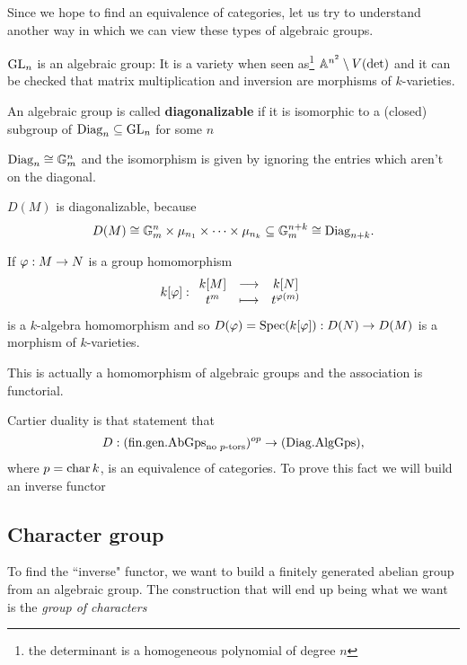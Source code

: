 Since we hope to find an equivalence of categories, let us try to understand another way in which we can view these types of algebraic groups.



\begin{remark}
$\mathrm{GL}_n$ is an algebraic group: It is a variety when seen as\footnote{the determinant is a homogeneous polynomial of degree $n$} $\mathbb{A}^{n^2}\setminus V(\det)$ and it can be checked that matrix multiplication and inversion are morphisms of $k$-varieties.
\end{remark}

\begin{definition}
An algebraic group is called \textbf{diagonalizable} if it is isomorphic to a (closed) subgroup of $\mathrm{Diag}_n\subseteq \mathrm{GL}_n$ for some $n$
\end{definition}

\begin{remark}
$\mathrm{Diag}_n\cong\mathbb{G}_m^n$ and the isomorphism is given by ignoring the entries which aren't on the diagonal.
\end{remark}

\begin{remark}
$D(M)$ is diagonalizable, because
\[D(M)\cong \mathbb{G}_m^n\times\mu_{n_1}\times\cdots\times\mu_{n_k}\subseteq \mathbb{G}_m^{n+k}\cong \mathrm{Diag}_{n+k}.\]
\end{remark}

\begin{proposition}
If $\varphi:M\to N$ is a group homomorphism 
\[k[\varphi]:\begin{array}{ccc} {k[M]} & \longrightarrow & {k[N]}\\ {t^m} & \longmapsto & {t^{\varphi(m)}} \end{array}\] 
is a $k$-algebra homomorphism and so $D(\varphi)=\operatorname{Spec}(k[\varphi]):D(N)\to D(M)$ is a morphism of $k$-varieties.

This is actually a homomorphism of algebraic groups and the association is functorial.
\end{proposition}

Cartier duality is that statement that
\[D:(\text{fin.gen.AbGps}_{\text{no $p$-tors}})^{op}\to (\text{Diag.AlgGps}),\]
where $p=\operatorname{char} k$, is an equivalence of categories. To prove this fact we will build an inverse functor

\subsection{Character group}
To find the ``inverse" functor, we want to build a finitely generated abelian group from an algebraic group. The construction that will end up being what we want is the \textit{group of characters}


